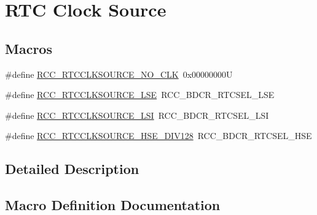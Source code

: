 \hypertarget{group___r_c_c___r_t_c___clock___source}{}\section{R\+TC Clock Source}
\label{group___r_c_c___r_t_c___clock___source}
\subsection*{Macros}
\begin{DoxyCompactItemize}
\item 
\#define \hyperlink{group___r_c_c___r_t_c___clock___source_gacce0b2f54d103340d8c3a218e86e295d}{R\+C\+C\+\_\+\+R\+T\+C\+C\+L\+K\+S\+O\+U\+R\+C\+E\+\_\+\+N\+O\+\_\+\+C\+LK}~0x00000000U
\item 
\#define \hyperlink{group___r_c_c___r_t_c___clock___source_ga5dca8d63f250a20bd6bc005670d0c150}{R\+C\+C\+\_\+\+R\+T\+C\+C\+L\+K\+S\+O\+U\+R\+C\+E\+\_\+\+L\+SE}~R\+C\+C\+\_\+\+B\+D\+C\+R\+\_\+\+R\+T\+C\+S\+E\+L\+\_\+\+L\+SE
\item 
\#define \hyperlink{group___r_c_c___r_t_c___clock___source_gab47a1afb8b5eef9f20f4772961d0a5f4}{R\+C\+C\+\_\+\+R\+T\+C\+C\+L\+K\+S\+O\+U\+R\+C\+E\+\_\+\+L\+SI}~R\+C\+C\+\_\+\+B\+D\+C\+R\+\_\+\+R\+T\+C\+S\+E\+L\+\_\+\+L\+SI
\item 
\#define \hyperlink{group___r_c_c___r_t_c___clock___source_ga7e022374ec3ceffa94e5bb6310c35c83}{R\+C\+C\+\_\+\+R\+T\+C\+C\+L\+K\+S\+O\+U\+R\+C\+E\+\_\+\+H\+S\+E\+\_\+\+D\+I\+V128}~R\+C\+C\+\_\+\+B\+D\+C\+R\+\_\+\+R\+T\+C\+S\+E\+L\+\_\+\+H\+SE
\end{DoxyCompactItemize}


\subsection{Detailed Description}


\subsection{Macro Definition Documentation}
\mbox{\label{group___r_c_c___r_t_c___clock___source_ga7e022374ec3ceffa94e5bb6310c35c83}} 
